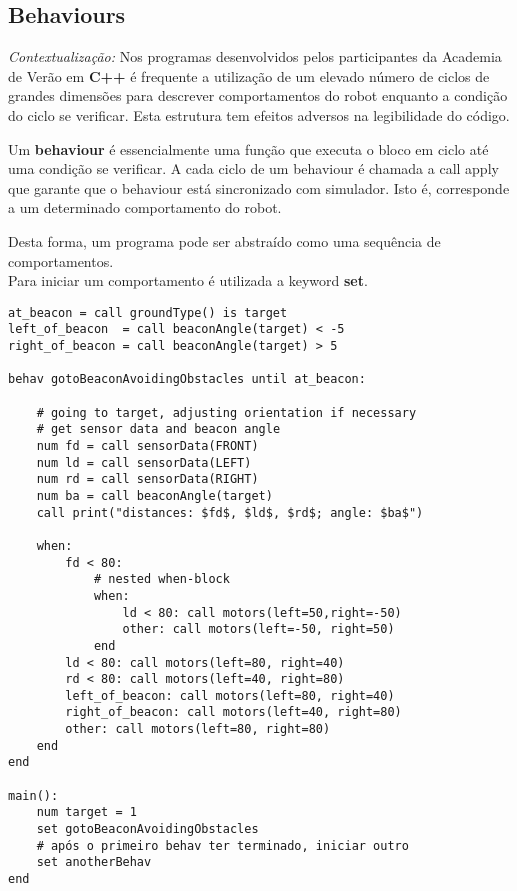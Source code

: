 \documentclass{report}
\begin{document}
\subsection{Behaviours}
\label{behav}

\textit{Contextualização:} 
Nos programas desenvolvidos pelos participantes da Academia de Verão em \textbf{C++} é frequente a utilização de um elevado número de ciclos de grandes dimensões para descrever comportamentos do robot enquanto a condição do ciclo se verificar. Esta estrutura tem efeitos adversos na legibilidade do código.

Um \textbf{behaviour} é essencialmente uma função que executa o bloco em ciclo até uma condição se verificar. A cada ciclo de um behaviour é chamada a call apply que garante que o behaviour está sincronizado com simulador. 
Isto é, corresponde a um determinado comportamento do robot.

Desta forma, um programa pode ser abstraído como uma sequência de comportamentos.\\

Para iniciar um comportamento é utilizada a keyword \textbf{set}.

\begin{verbatim}
at_beacon = call groundType() is target
left_of_beacon  = call beaconAngle(target) < -5
right_of_beacon = call beaconAngle(target) > 5

behav gotoBeaconAvoidingObstacles until at_beacon:

    # going to target, adjusting orientation if necessary
    # get sensor data and beacon angle
    num fd = call sensorData(FRONT)
    num ld = call sensorData(LEFT)
    num rd = call sensorData(RIGHT)
    num ba = call beaconAngle(target)
    call print("distances: $fd$, $ld$, $rd$; angle: $ba$")

    when:
        fd < 80:
            # nested when-block
            when:
                ld < 80: call motors(left=50,right=-50)
                other: call motors(left=-50, right=50)
            end
        ld < 80: call motors(left=80, right=40)
        rd < 80: call motors(left=40, right=80)
        left_of_beacon: call motors(left=80, right=40)
        right_of_beacon: call motors(left=40, right=80)
        other: call motors(left=80, right=80)
    end
end

main():
    num target = 1
    set gotoBeaconAvoidingObstacles
    # após o primeiro behav ter terminado, iniciar outro
    set anotherBehav
end
\end{verbatim}
\end{document}
